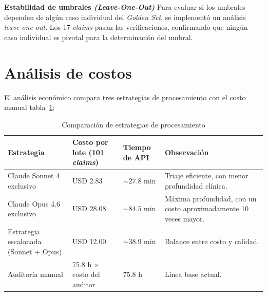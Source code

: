 \textbf{Estabilidad de umbrales \textit{(Leave-One-Out)}} Para evaluar si los umbrales dependen de algún caso individual del \textit{Golden Set}, se implementó un análisis \textit{leave-one-out}. Los 17 \textit{claims} pasan las verificaciones, confirmando que ningún caso individual es pivotal para la determinación del umbral.

\section{Análisis de costos}

El análisis económico compara tres estrategias de procesamiento con el costo manual tabla~\ref{tab:comparacion-estrategias-procesamiento}:

\begin{table}[H]
    \centering
    \caption{Comparación de estrategias de procesamiento}
    \label{tab:comparacion-estrategias-procesamiento}

    \footnotesize
    \setlength{\tabcolsep}{6pt}
    \renewcommand{\arraystretch}{1.3}

    \begin{tabular}{
        p{}
        p{}
        p{}
        p{}
    }
        \toprule
        \textbf{Estrategia}
        & \textbf{Costo por lote (101 \textit{claims})}
        & \textbf{Tiempo de API}
        & \textbf{Observación} \\
        \midrule

        Claude Sonnet 4 exclusivo
        & USD 2.83
        & $\sim 27.8$ min
        & Triaje eficiente, con menor profundidad clínica. \\

        Claude Opus 4.6 exclusivo
        & USD 28.08
        & $\sim 84.5$ min
        & Máxima profundidad, con un costo aproximadamente 10 veces mayor. \\

        Estrategia escalonada (Sonnet + Opus)
        & USD 12.00
        & $\sim 38.9$ min
        & Balance entre costo y calidad. \\

        Auditoría manual
        & 75.8 h $\times$ costo del auditor
        & 75.8 h
        & Línea base actual. \\

        \bottomrule
    \end{tabular}
\end{table}


